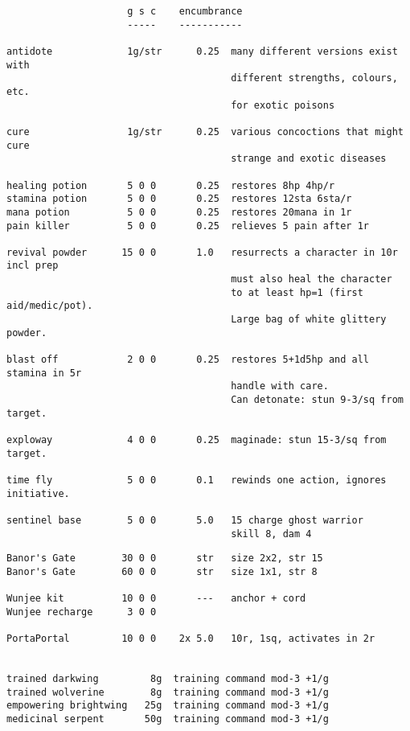 \small
\begin{verbatim}
                     g s c    encumbrance
                     -----    -----------

antidote             1g/str      0.25  many different versions exist with
                                       different strengths, colours, etc.
                                       for exotic poisons

cure                 1g/str      0.25  various concoctions that might cure
                                       strange and exotic diseases

healing potion       5 0 0       0.25  restores 8hp 4hp/r
stamina potion       5 0 0       0.25  restores 12sta 6sta/r
mana potion          5 0 0       0.25  restores 20mana in 1r
pain killer          5 0 0       0.25  relieves 5 pain after 1r

revival powder      15 0 0       1.0   resurrects a character in 10r incl prep
                                       must also heal the character
                                       to at least hp=1 (first aid/medic/pot).
                                       Large bag of white glittery powder.

blast off            2 0 0       0.25  restores 5+1d5hp and all stamina in 5r
                                       handle with care.
                                       Can detonate: stun 9-3/sq from target.

exploway             4 0 0       0.25  maginade: stun 15-3/sq from target.

time fly             5 0 0       0.1   rewinds one action, ignores initiative.

sentinel base        5 0 0       5.0   15 charge ghost warrior
                                       skill 8, dam 4

\end{verbatim} \pagebreak[1] \begin{verbatim}
Banor's Gate        30 0 0       str   size 2x2, str 15
Banor's Gate        60 0 0       str   size 1x1, str 8

Wunjee kit          10 0 0       ---   anchor + cord
Wunjee recharge      3 0 0

PortaPortal         10 0 0    2x 5.0   10r, 1sq, activates in 2r


trained darkwing         8g  training command mod-3 +1/g
trained wolverine        8g  training command mod-3 +1/g
empowering brightwing   25g  training command mod-3 +1/g
medicinal serpent       50g  training command mod-3 +1/g

\end{verbatim}
\normalsize

